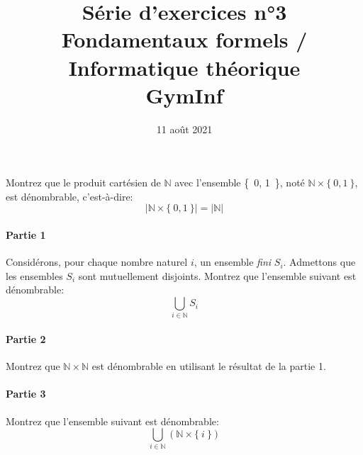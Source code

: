 \documentclass[12pt,french,a4paper]{article}
\begin{document}
\title{\vspace{-2cm}Série d'exercices n°3\\\large{Fondamentaux formels / Informatique théorique\\GymInf}}
\date{\vspace{-1cm}11 août 2021}

\maketitle

\begin{question}
Montrez que le produit cartésien de $\mathbb{N}$ avec l'ensemble \{\ 0, 1\ \}, noté $\mathbb{N} \times \{\ 0, 1\ \}$, est dénombrable, c'est-à-dire:
\[
|\mathbb{N} \times \{\ 0, 1\ \}| = |\mathbb{N}|
\]
\end{question}

\begin{question}
\paragraph{Partie 1}
Considérons, pour chaque nombre naturel $i$, un ensemble \textit{fini} $S_i$.
Admettons que les ensembles $S_i$ sont mutuellement disjoints.
Montrez que l'ensemble suivant est dénombrable:
\[
\bigcup_{i \in \mathbb{N}} S_i
\]

\paragraph{Partie 2}
Montrez que $\mathbb{N} \times \mathbb{N}$ est dénombrable en utilisant le résultat de la partie 1.

\paragraph{Partie 3}
Montrez que l'ensemble suivant est dénombrable:
\[
\bigcup_{i \in \mathbb{N}} (\mathbb{N} \times \{\ i\ \})
\]
\end{question}
\end{document}
